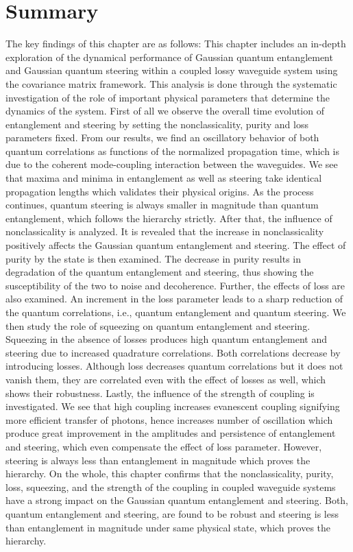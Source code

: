 \section{Summary}
The key findings of this chapter are as follows:
This chapter includes an in-depth exploration of the dynamical performance of Gaussian quantum entanglement and Gaussian quantum steering within a coupled lossy waveguide system using the covariance matrix framework. This analysis is done through the systematic investigation of the role of important physical parameters that determine the dynamics of the system.
First of all we observe the overall time evolution of entanglement and steering by setting the nonclassicality, purity and loss parameters fixed. From our results, we find an oscillatory behavior of both quantum correlations as functions of the normalized propagation time, which is due to the coherent mode-coupling interaction between the waveguides. We see that maxima and minima in entanglement as well as steering take identical propagation lengths which validates their physical origins. As the process continues, quantum steering is always smaller in magnitude than quantum entanglement, which follows the hierarchy strictly.
After that, the influence of nonclassicality is analyzed. It is revealed that the increase in nonclassicality positively affects the Gaussian quantum entanglement and steering.
The effect of purity by the state is then examined. The decrease in purity  results in degradation of the quantum entanglement and steering, thus showing the susceptibility of the two to noise and decoherence. 
Further, the effects of loss are also examined. An increment in the loss parameter leads to a sharp reduction of the quantum correlations, i.e., quantum entanglement and quantum steering.
We then study the role of squeezing on quantum entanglement and steering. Squeezing in the absence of losses produces high quantum entanglement and steering due to increased quadrature correlations. Both correlations decrease by introducing losses. Although loss decreases quantum correlations but it does not vanish them, they are correlated even with the effect of losses as well, which shows their robustness.
Lastly, the influence of the strength of coupling is investigated. We see that high coupling increases evanescent coupling signifying more efficient transfer of photons, hence increases number of oscillation which produce great improvement in the amplitudes and persistence of entanglement and steering, which even compensate the effect of loss parameter. However, steering is always less than entanglement in magnitude which proves the  hierarchy.
On the whole, this chapter confirms that the nonclassicality, purity, loss, squeezing, and the strength of the coupling in coupled waveguide systems have a strong impact on the Gaussian quantum entanglement and steering. Both, quantum entanglement and steering, are found to be robust and steering is less than entanglement in magnitude under same physical state, which proves the hierarchy. 